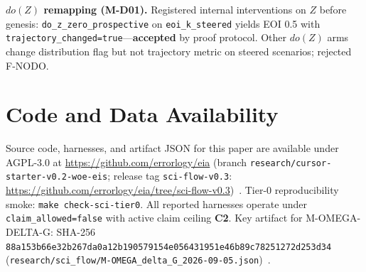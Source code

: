 \documentclass[11pt,a4paper]{article}
\theoremstyle{definition}
\begin{document}
\textbf{$do(Z)$ remapping (M-D01).} Registered internal interventions on $Z$ before genesis: \texttt{do\_z\_zero\_prospective} on \texttt{eoi\_k\_steered} yields EOI 0.5 with \texttt{trajectory\_changed=true}---\textbf{accepted} by proof protocol. Other $do(Z)$ arms change distribution flag but not trajectory metric on steered scenarios; rejected F-NODO.

\section{Code and Data Availability}\label{sec:code-data}

Source code, harnesses, and artifact JSON for this paper are available under AGPL-3.0 at \url{https://github.com/errorlogy/eia} (branch \texttt{research/cursor-starter-v0.2-woe-eis}; release tag \texttt{sci-flow-v0.3}: \url{https://github.com/errorlogy/eia/tree/sci-flow-v0.3})~\cite{kuznetsov2026eia,kuznetsov2026sciflowrelease}. Tier-0 reproducibility smoke: \texttt{make check-sci-tier0}. All reported harnesses operate under \texttt{claim\_allowed=false} with active claim ceiling \textbf{C2}. Key artifact for M-OMEGA-DELTA-G: SHA-256 \texttt{88a153b66e32b267da0a12b190579154e056431951e46b89c78251272d253d34} (\texttt{research/sci\_flow/M-OMEGA\_delta\_G\_2026-09-05.json})~\cite{kuznetsov2026omega_delta}.



\end{document}
